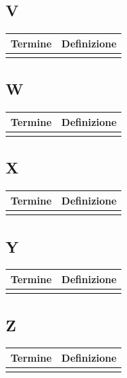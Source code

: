 \documentclass[10pt]{article}
\begin{document}
\subsection{V} %
\begin{tabularx}{\textwidth}{|>{\centering\arraybackslash}l|X|}
\hline
\rowcolor[gray]{0.8}
\textbf{Termine} & \textbf{Definizione}\\
\hline
 & \\
\hline
\end{tabularx}

\subsection{W} %
\begin{tabularx}{\textwidth}{|>{\centering\arraybackslash}l|X|}
\hline
\rowcolor[gray]{0.8}
\textbf{Termine} & \textbf{Definizione}\\
\hline
 & \\
\hline
\end{tabularx}

\subsection{X} %
\begin{tabularx}{\textwidth}{|>{\centering\arraybackslash}l|X|}
\hline
\rowcolor[gray]{0.8}
\textbf{Termine} & \textbf{Definizione}\\
\hline
 & \\
\hline
\end{tabularx}

\subsection{Y} %
\begin{tabularx}{\textwidth}{|>{\centering\arraybackslash}l|X|}
\hline
\rowcolor[gray]{0.8}
\textbf{Termine} & \textbf{Definizione}\\
\hline
 & \\
\hline
\end{tabularx}

\subsection{Z} %
\begin{tabularx}{\textwidth}{|>{\centering\arraybackslash}l|X|}
\hline
\rowcolor[gray]{0.8}
\textbf{Termine} & \textbf{Definizione}\\
\hline
 & \\
\hline
\end{tabularx}
\end{document}
